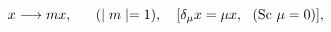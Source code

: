 \begin{equation}
x \longrightarrow m x,~~~~~(\mid m\mid = 1),~~~[\delta_{\mu} x = \mu x, ~~({\rm Sc}~\mu = 0)],
\end{equation}

